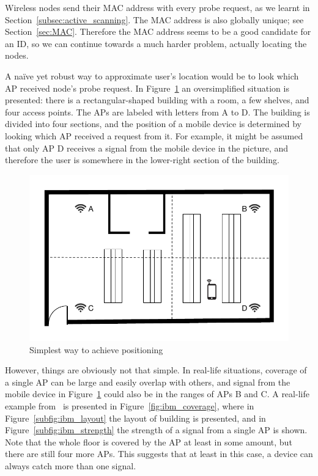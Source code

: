\documentclass[12pt,a4paper,oneside,pdftex]{report}
\begin{document}
Wireless nodes send their MAC address with every probe request, as we learnt in Section~\ref{subsec:active_scanning}. The MAC address is also globally unique; see Section~\ref{sec:MAC}. Therefore the MAC address seems to be a good candidate for an ID, so we can continue towards a much harder problem, actually locating the nodes.

A na{\"i}ve yet robust way to approximate user's location would be to look which AP received node's probe request. In Figure~\ref{fig:position_1} an oversimplified situation is presented: there is a rectangular-shaped building with a room, a few shelves, and four access points. The APs are labeled with letters from A to D. The building is divided into four sections, and the position of a mobile device is determined by looking which AP received a request from it. For example, it might be assumed that only AP D receives a signal from the mobile device in the picture, and therefore the user is somewhere in the lower-right section of the building.

\begin{figure}
    \label{fig:position_1}
    \includegraphics{images/positioning_1.pdf}
    \caption{Simplest way to achieve positioning}
\end{figure}

However, things are obviously not that simple. In real-life situations, coverage of a single AP can be large and easily overlap with others, and signal from the mobile device in Figure~\ref{fig:position_1} could also be in the ranges of APs B and C. A real-life example from~\cite{xiang2004} is presented in Figure~\ref{fig:ibm_coverage}, where in Figure~\ref{subfig:ibm_layout} the layout of building is presented, and in Figure~\ref{subfig:ibm_strength} the strength of a signal from a single AP is shown. Note that the whole floor is covered by the AP at least in some amount, but there are still four more APs. This suggests that at least in this case, a device can always catch more than one signal.
\end{document}
